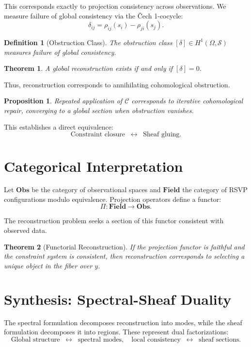 \documentclass[12pt]{article}
\newtheorem{definition}{Definition}
\newtheorem{theorem}{Theorem}
\newtheorem{proposition}{Proposition}
\begin{document}
This corresponds exactly to projection consistency across observations. We measure failure of global consistency via the \v{C}ech 1-cocycle:
\[
\delta_{ij} = \rho_{ij}(s_i) - \rho_{ji}(s_j).
\]

\begin{definition}[Obstruction Class]
The obstruction class $[\delta] \in H^1(\Omega, \mathcal{S})$ measures failure of global consistency.
\end{definition}

\begin{theorem}
A global reconstruction exists if and only if $[\delta] = 0$.
\end{theorem}

Thus, reconstruction corresponds to annihilating cohomological obstruction.

\begin{proposition}
Repeated application of $\mathcal{C}$ corresponds to iterative cohomological repair, converging to a global section when obstruction vanishes.
\end{proposition}

This establishes a direct equivalence:
\[
\text{Constraint closure} \;\;\longleftrightarrow\;\; \text{Sheaf gluing}.
\]

\section{Categorical Interpretation}

Let $\mathbf{Obs}$ be the category of observational spaces and $\mathbf{Field}$ the category of RSVP configurations modulo equivalence. Projection operators define a functor:
\[
\Pi : \mathbf{Field} \to \mathbf{Obs}.
\]

The reconstruction problem seeks a section of this functor consistent with observed data.

\begin{theorem}[Functorial Reconstruction]
If the projection functor is faithful and the constraint system is consistent, then reconstruction corresponds to selecting a unique object in the fiber over $y$.
\end{theorem}

\section{Synthesis: Spectral-Sheaf Duality}

The spectral formulation decomposes reconstruction into modes, while the sheaf formulation decomposes it into regions. These represent dual factorizations:
\[
\text{Global structure} \;\;\leftrightarrow\;\; \text{spectral modes},
\quad
\text{local consistency} \;\;\leftrightarrow\;\; \text{sheaf sections}.
\]
\end{document}
